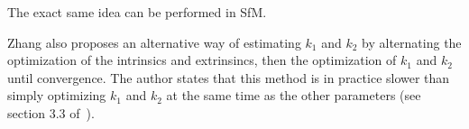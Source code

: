 The exact same idea can be performed in SfM\@.

Zhang also proposes an alternative way of estimating $k_1$ and $k_2$ by alternating the optimization of the intrinsics
and extrinsincs, then the optimization of $k_1$ and $k_2$ until convergence.
The author states that this method is in practice slower than simply optimizing $k_1$ and $k_2$ at the same time as the
other parameters (see section 3.3 of~\citep{zhang}).